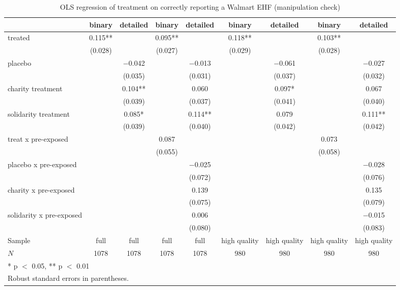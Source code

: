 \documentclass[
  11pt,
  oneside]{article}
\begin{document}
\begin{table}
\centering
\caption{\label{tab:setup}OLS regression of treatment on correctly reporting a Walmart EHF (manipulation check) \label{tab:tab-manip-check}}
\centering
\begin{tabular}[t]{lcccccccc}
\toprule
  & binary & detailed & binary  & detailed  & binary   & detailed   & binary    & detailed   \\
\midrule
treated & \num{0.115}** &  & \num{0.095}** &  & \num{0.118}** &  & \num{0.103}** & \\
 & (\num{0.028}) &  & (\num{0.027}) &  & (\num{0.029}) &  & (\num{0.028}) & \\
placebo &  & \num{-0.042} &  & \num{-0.013} &  & \num{-0.061} &  & \num{-0.027}\\
 &  & (\num{0.035}) &  & (\num{0.031}) &  & (\num{0.037}) &  & (\num{0.032})\\
charity treatment &  & \num{0.104}** &  & \num{0.060} &  & \num{0.097}* &  & \num{0.067}\\
 &  & (\num{0.039}) &  & (\num{0.037}) &  & (\num{0.041}) &  & (\num{0.040})\\
solidarity treatment &  & \num{0.085}* &  & \num{0.114}** &  & \num{0.079} &  & \num{0.111}**\\
 &  & (\num{0.039}) &  & (\num{0.040}) &  & (\num{0.042}) &  & (\num{0.042})\\
treat x pre-exposed &  &  & \num{0.087} &  &  &  & \num{0.073} & \\
 &  &  & (\num{0.055}) &  &  &  & (\num{0.058}) & \\
placebo x pre-exposed &  &  &  & \num{-0.025} &  &  &  & \num{-0.028}\\
 &  &  &  & (\num{0.072}) &  &  &  & (\num{0.076})\\
charity x pre-exposed &  &  &  & \num{0.139} &  &  &  & \num{0.135}\\
 &  &  &  & (\num{0.075}) &  &  &  & (\num{0.079})\\
solidarity x pre-exposed &  &  &  & \num{0.006} &  &  &  & \num{-0.015}\\
 &  &  &  & (\num{0.080}) &  &  &  & (\num{0.083})\\
\midrule
Sample & full & full & full & full & high quality & high quality & high quality & high quality\\
$N$ & \num{1078} & \num{1078} & \num{1078} & \num{1078} & \num{980} & \num{980} & \num{980} & \num{980}\\
\bottomrule
\multicolumn{9}{l}{\rule{0pt}{1em}* p $<$ 0.05, ** p $<$ 0.01}\\
\multicolumn{9}{l}{\rule{0pt}{1em}Robust standard errors in parentheses.}\\
\end{tabular}
\end{table}
\end{document}
